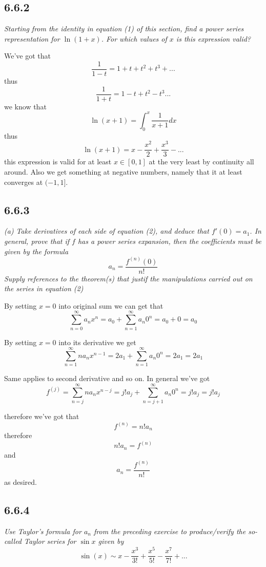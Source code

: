 \documentclass[11pt,oneside,titlepage]{book}
\begin{document}
\subsection*{6.6.2}
\textit{Starting from the identity in equation (1) of this section,
  find a power series representation for $\ln{(1 + x)}$. For which values
  of $x$ is this expression valid?}

We've got that
$$\frac{1}{1 - t} = 1 + t + t^2 + t^3 + ...$$
thus
$$\frac{1}{1 + t} = 1 - t + t^2 - t^3 ...$$
we know that
$$\ln{(x + 1)} = \int_0^x{\frac{1}{x + 1} dx}$$
thus
$$\ln{(x + 1)} = x - \frac{x^2}{2} + \frac{x^3}{3} - ... $$
this expression is valid for at least $x \in [0, 1]$ at the very least by
continuity all around. Also we get something at negative numbers, namely
that it at least converges at $(-1, 1]$.

\subsection*{6.6.3}
\textit{(a) Take derivatives of each side of equation (2), and deduce that
  $f'(0) = a_1$. In general, prove that if $f$ has a power series expansion,
  then the coefficients must be given by the formula}
$$a_n = \frac{f^{(n)}(0)}{n!}$$
\textit{Supply references to the theorem(s) that justif the manipulations
  carried out on the series in equation (2)}

By setting $x = 0$ into original sum  we can get that
$$\sum_{n = 0}^{\infty}{a_n x^n} = a_0 + \sum_{n = 1}^{\infty}{a_n 0^n} =
a_0 + 0 = a_0$$

By setting $x = 0$ into its derivative we get
$$\sum_{n = 1}^{\infty}{n a_n x^{n - 1}} = 2a_1 +
\sum_{n = 1}^{\infty}{a_n 0^n} = 2 a_1  = 2 a_1$$

Same applies to second derivative and so on. In general we've got
$$f^{(j)} = \sum_{n = j}^{\infty}{n a_n x^{n - j}} = j! a_j +
\sum_{n = j + 1}^{\infty}{a_n 0^n} = j! a_j  = j! a_j$$

therefore we've got that
$$f^{(n)} = n! a_n$$
therefore
$$ n! a_n = f^{(n)}$$
and
$$  a_n = \frac{f^{(n)}}{n!}$$
as desired.

\subsection*{6.6.4}
\textit{Use Taylor's formula for $a_n$ from the preceding exercise to
  produce/verify the so-called Taylor series for $\sin x$ given by}
$$\sin(x) \sim x - \frac{x^3}{3!} + \frac{x^5}{5!} - \frac{x^7}{7!} + ...$$
\end{document}
